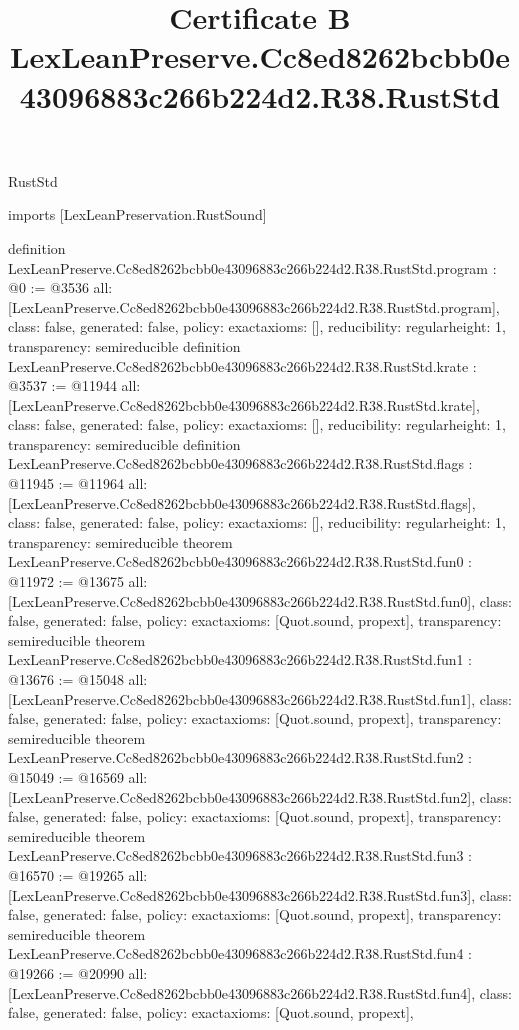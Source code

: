\begin{lexlean}{RustStd}
\title{Certificate B LexLeanPreserve.Cc8ed8262bcbb0e43096883c266b224d2.R38.RustStd}
\begin{coremodule}
imports [LexLeanPreservation.RustSound]

definition LexLeanPreserve.Cc8ed8262bcbb0e43096883c266b224d2.R38.RustStd.program : @0 := @3536 {
  all: [LexLeanPreserve.Cc8ed8262bcbb0e43096883c266b224d2.R38.RustStd.program],
  class: false,
  generated: false,
  policy: exact{axioms: []},
  reducibility: regular{height: 1},
  transparency: semireducible
}
definition LexLeanPreserve.Cc8ed8262bcbb0e43096883c266b224d2.R38.RustStd.krate : @3537 := @11944 {
  all: [LexLeanPreserve.Cc8ed8262bcbb0e43096883c266b224d2.R38.RustStd.krate],
  class: false,
  generated: false,
  policy: exact{axioms: []},
  reducibility: regular{height: 1},
  transparency: semireducible
}
definition LexLeanPreserve.Cc8ed8262bcbb0e43096883c266b224d2.R38.RustStd.flags : @11945 := @11964 {
  all: [LexLeanPreserve.Cc8ed8262bcbb0e43096883c266b224d2.R38.RustStd.flags],
  class: false,
  generated: false,
  policy: exact{axioms: []},
  reducibility: regular{height: 1},
  transparency: semireducible
}
theorem LexLeanPreserve.Cc8ed8262bcbb0e43096883c266b224d2.R38.RustStd.fun0 : @11972 := @13675 {
  all: [LexLeanPreserve.Cc8ed8262bcbb0e43096883c266b224d2.R38.RustStd.fun0],
  class: false,
  generated: false,
  policy: exact{axioms: [Quot.sound, propext]},
  transparency: semireducible
}
theorem LexLeanPreserve.Cc8ed8262bcbb0e43096883c266b224d2.R38.RustStd.fun1 : @13676 := @15048 {
  all: [LexLeanPreserve.Cc8ed8262bcbb0e43096883c266b224d2.R38.RustStd.fun1],
  class: false,
  generated: false,
  policy: exact{axioms: [Quot.sound, propext]},
  transparency: semireducible
}
theorem LexLeanPreserve.Cc8ed8262bcbb0e43096883c266b224d2.R38.RustStd.fun2 : @15049 := @16569 {
  all: [LexLeanPreserve.Cc8ed8262bcbb0e43096883c266b224d2.R38.RustStd.fun2],
  class: false,
  generated: false,
  policy: exact{axioms: [Quot.sound, propext]},
  transparency: semireducible
}
theorem LexLeanPreserve.Cc8ed8262bcbb0e43096883c266b224d2.R38.RustStd.fun3 : @16570 := @19265 {
  all: [LexLeanPreserve.Cc8ed8262bcbb0e43096883c266b224d2.R38.RustStd.fun3],
  class: false,
  generated: false,
  policy: exact{axioms: [Quot.sound, propext]},
  transparency: semireducible
}
theorem LexLeanPreserve.Cc8ed8262bcbb0e43096883c266b224d2.R38.RustStd.fun4 : @19266 := @20990 {
  all: [LexLeanPreserve.Cc8ed8262bcbb0e43096883c266b224d2.R38.RustStd.fun4],
  class: false,
  generated: false,
  policy: exact{axioms: [Quot.sound, propext]},
}
\end{coremodule}
\end{lexlean}
